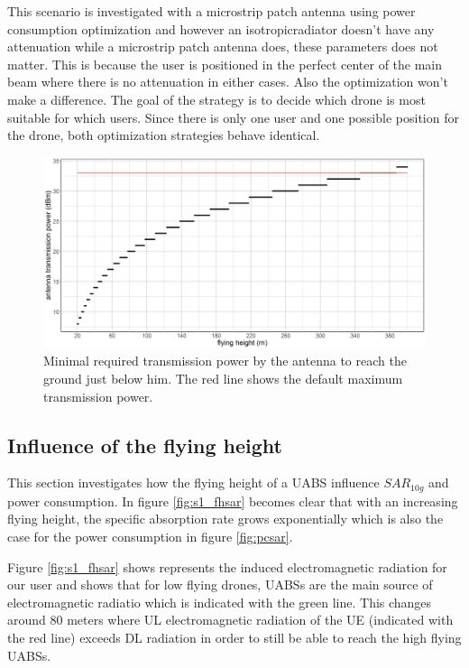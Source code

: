 This scenario is investigated with a microstrip patch antenna using power consumption optimization
and however an \gls{isotropicradiator} doesn't have any attenuation while a microstrip patch antenna does, these parameters does not matter.
This is because the user is positioned in the perfect center of the main beam where there is 
no attenuation in either cases. Also the optimization won't make a difference. The goal of the  strategy is to decide which drone is most suitable for which
users. Since there is only one user and one possible position for the drone, both optimization strategies behave identical.

\begin{figure}[h!]
  \includegraphics[width=\textwidth]{../results/s1/ptx.png}
  \caption{Minimal required transmission power by the antenna to reach the ground just below him. The red line shows the default maximum transmission power.}
  \label{fig:ptxfh}
\end{figure}

\subsection{Influence of the flying height}
\label{sub:senario1_influenceOfFlyHeight}

This section investigates how the flying height of a \gls{UABS} influence $SAR_{10g}$ and power consumption. In figure \ref{fig:s1_fhsar}
becomes clear that with an increasing flying height, the specific absorption rate grows exponentially 
which is also the case for the power consumption in figure \ref{fig:pcsar}.

Figure \ref{fig:s1_fhsar} shows represents the induced electromagnetic radiation for our user 
and shows that for low flying drones, \gls{UABS}s are the main source of electromagnetic radiatio which is indicated with the green line.
This changes around 80 meters where \gls{UL} electromagnetic radiation of the \gls{UE} (indicated with the red line)
exceeds \gls{DL} radiation in order to still be able to reach the high flying \gls{UABS}s.


